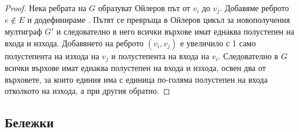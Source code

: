\begin{proof}
    Нека ребрата на \(G\) образуват Ойлеров път от \(v_i\) до \(v_j\). Добавяме 
    реброто \(e \not \in E\) и додефинираме . Пътят се превръща в Ойлеров 
    цикъл за новополучения мултиграф \(G'\) и следователно в него всички върхове имат еднаква полустепен 
    на входа и изхода. Добавянето на реброто \((v_i, v_j)\) е увеличило с 1 само полустепента на изхода 
    на \(v_j\) и полустепента на входа на \(v_i\). Следователно в \(G\) всички върхове имат еднаква 
    полустепен на входа и изхода, освен два от върховете, за които единия има с единица по-голяма 
    полустепен на входа отколкото на изхода, а при другия обратно.
\end{proof}

\subsection{Бележки}
